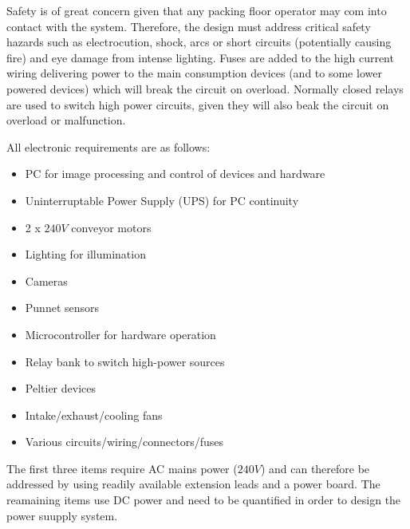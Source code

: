 \documentclass[fleqn,twoside]{article}
\begin{document}
Safety is of great concern given that any packing floor operator may com into contact with the system. Therefore, the design must address critical safety hazards such as electrocution, shock, arcs or short circuits (potentially causing fire) and eye damage from intense lighting. Fuses are added to the high current wiring delivering power to the main consumption devices (and to some lower powered devices) which will break the circuit on overload. Normally closed relays are used to switch high power circuits, given they will also beak the circuit on overload or malfunction.  


All electronic requirements are as follows:



\begin{itemize}
	\item PC for image processing and control of devices and hardware
	\item Uninterruptable Power Supply (UPS) for PC continuity
	\item 2 x $240V$ conveyor motors
	\item Lighting for illumination
	\item Cameras 
	\item Punnet sensors
	\item Microcontroller for hardware operation
	\item Relay bank to switch high-power sources
	\item Peltier devices
	\item Intake/exhaust/cooling fans
	\item Various circuits/wiring/connectors/fuses
\end{itemize} 

The first three items require AC mains power ($240V$) and can therefore be addressed by using readily available extension leads and a power board. The reamaining items use DC power and need to be quantified in order to design the power suupply system.
\end{document}

